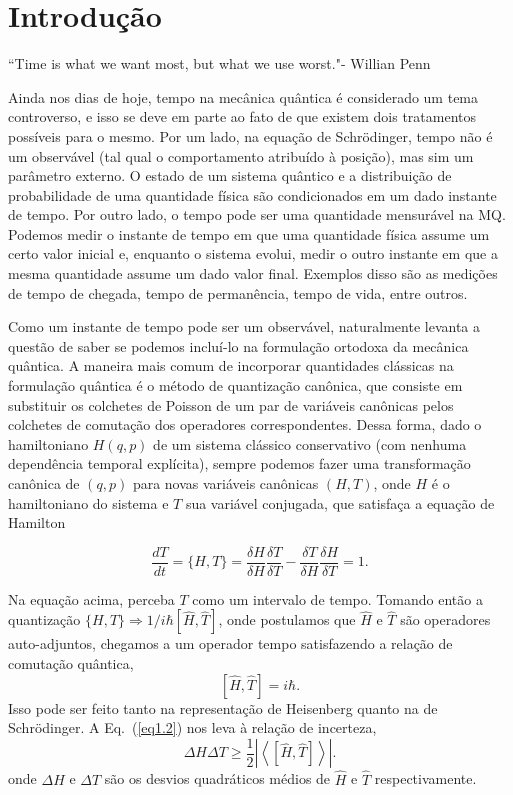 \chapter{Introdução}
\label{chap:intro}

 \begin{citacao}
 “Time is what we want most, but what we use worst."- Willian Penn  
 \end{citacao}

	Ainda nos dias de hoje, tempo na mecânica quântica é considerado um tema controverso, e isso se deve em parte ao fato de que existem dois tratamentos possíveis para o mesmo. Por um lado, na equação de Schrödinger, tempo não é um observável (tal qual o comportamento atribuído à posição), mas sim um parâmetro externo. O estado de um sistema quântico e a distribuição de probabilidade de uma quantidade física são condicionados em um dado instante de tempo. Por outro lado, o tempo pode ser uma quantidade mensurável na  MQ. Podemos medir o instante de tempo em que uma quantidade física assume um certo valor inicial e, enquanto o sistema evolui, medir o outro instante em que a mesma quantidade assume um dado valor final. Exemplos disso são as medições de tempo de chegada, tempo de permanência, tempo de vida, entre outros. 

	Como um instante de tempo pode ser um observável, naturalmente levanta a questão de saber se podemos incluí-lo na formulação ortodoxa da mecânica quântica. A maneira mais comum de incorporar quantidades clássicas na formulação quântica é o método de quantização canônica, que consiste em substituir os colchetes de Poisson de um par de variáveis canônicas pelos colchetes de comutação dos operadores correspondentes. Dessa forma, dado o hamiltoniano $H(q, p)$ de um sistema clássico conservativo (com nenhuma dependência temporal explícita), sempre podemos fazer uma transformação canônica de $(q, p)$ para novas variáveis canônicas $(H, T)$, onde $H$ é o hamiltoniano do sistema e $T$ sua variável conjugada, que satisfaça a equação de Hamilton

\begin{equation} \label{eq1.1}
	\frac{dT}{dt} = \{ H, T \} = \frac{\delta H}{\delta H} \frac{\delta T}{\delta T} - \frac{\delta T}{\delta H} \frac{\delta H}{\delta T} = 1.
\end{equation}

Na equação acima, perceba $T$ como um intervalo de tempo. Tomando então a quantização $ \{ H, T \} \Rightarrow 1/i \hbar [\hat{H},\hat{T}]$, onde postulamos que $\hat{H}$ e $\hat{T}$ são operadores auto-adjuntos, chegamos a um operador tempo satisfazendo a relação de comutação quântica,
\begin{equation} \label{eq1.2}
	 [\hat{H},\hat{T}] = i \hbar.
\end{equation}
Isso pode ser feito tanto na representação de Heisenberg quanto na de Schrödinger. A Eq.~(\ref{eq1.2}) nos leva à relação de incerteza,
\begin{equation} \label{eq1.3}
	 \Delta H \Delta T \ge  \frac{1}{2} \left| \left<   [\hat{H},\hat{T}]  \right> \right|. 
\end{equation}
onde $\Delta H$ e $\Delta T$ são os desvios quadráticos médios de $\hat{H}$ e $\hat{T}$ respectivamente.
    
